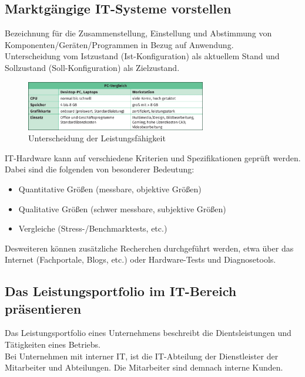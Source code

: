 \documentclass[11pt]{article}
\newlength{\subsectionindent}
\newenvironment{indentedtext}[1][\subsectionindent]
{%
  \begingroup
  \setlength{\leftskip}{#1}%
  \setlength{\parindent}{0pt}%
}
{%
  \par\endgroup
}
\begin{document}
\subsection{Marktgängige IT-Systeme vorstellen}
    \begin{tcolorbox}[width=15cm, center, title=Konfiguration, coltitle=white, colframe=orange, colback=white!60!orange]
        Bezeichnung für die Zusammenstellung, Einstellung und Abstimmung von Komponenten/Geräten/Programmen in Bezug auf Anwendung. \\
        Unterscheidung vom Istzustand (Ist-Konfiguration) als aktuellem Stand und Sollzustand (Soll-Konfiguration) als Zielzustand.
    \end{tcolorbox}
    \vspace{-1em}
    \begin{figure}[h]
        \centering
        \includegraphics[width=0.7\textwidth]{./images/2.2.2_pc-vergleich.png}
        \caption{Unterscheidung der Leistungsfähigkeit}\label{fig:Leistungsfähigkeit_Unterscheidung}
    \end{figure}
    \begin{indentedtext}
        IT-Hardware kann auf verschiedene Kriterien und Spezifikationen geprüft werden. \\
        Dabei sind die folgenden von besonderer Bedeutung:
    \end{indentedtext}
    \begin{itemize}[leftmargin=2.5cm, topsep=0.3em, itemsep=0.1em, parsep=0.5em]
        \item Quantitative Größen (messbare, objektive Größen)
        \item Qualitative Größen (schwer messbare, subjektive Größen)
        \item Vergleiche (Stress-/Benchmarktests, etc.)
    \end{itemize}
    \begin{indentedtext}
        Desweiteren können zusätzliche Recherchen durchgeführt werden, etwa über das Internet (Fachportale, Blogs, etc.) oder Hardware-Tests und Diagnosetools.
    \end{indentedtext}
\subsection{Das Leistungsportfolio im IT-Bereich präsentieren}
    \begin{indentedtext}
        Das Leistungsportfolio eines Unternehmens beschreibt die Dientsleistungen und Tätigkeiten eines Betriebs. \\
        Bei Unternehmen mit interner IT, ist die IT-Abteilung der Dienstleister der Mitarbeiter und Abteilungen. Die Mitarbeiter sind demnach interne Kunden.
    \end{indentedtext}
\end{document}
